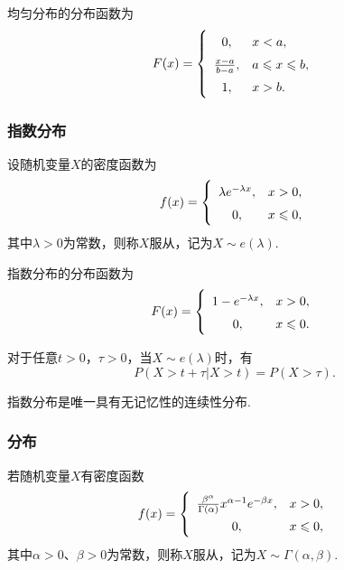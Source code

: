\begin{theorem}
均匀分布的分布函数为\begin{equation}
F(x) = \left\{ \def\arraystretch{1.5}
\begin{array}{cl}
0, & x < a, \\
\frac{x-a}{b-a}, & a \leqslant x \leqslant b, \\
1, & x > b. \\
\end{array} \right.
\end{equation}
\end{theorem}

\subsubsection{指数分布}
\begin{definition}
设随机变量\(X\)的密度函数为\begin{equation}
f(x) = \left\{ \def\arraystretch{1.5}
\begin{array}{cl}
\lambda e^{-\lambda x}, & x > 0, \\
0, & x \leqslant 0, \\
\end{array} \right.
\end{equation}其中\(\lambda > 0\)为常数，则称\(X\)服从，记为\(X \sim e(\lambda)\).
\end{definition}

\begin{theorem}
指数分布的分布函数为\begin{equation}
F(x) = \left\{ \def\arraystretch{1.5}
\begin{array}{cl}
1 - e^{-\lambda x}, & x > 0, \\
0, & x \leqslant 0. \\
\end{array} \right.
\end{equation}
\end{theorem}

\begin{theorem}[指数分布的无记忆性]
对于任意\(t > 0\)，\(\tau > 0\)，当\(X \sim e(\lambda)\)时，有\[
P(X > t + \tau \vert X > t) = P(X > \tau).
\]

指数分布是唯一具有无记忆性的连续性分布.
\end{theorem}

\subsubsection{\textGamma 分布}
\begin{definition}
若随机变量\(X\)有密度函数\begin{equation}
f(x) = \left\{
\def\arraystretch{1.5}
\begin{array}{cl}
\frac{\beta^{\alpha}}{\Gamma(\alpha)} x^{\alpha-1} e^{-\beta x}, & x > 0, \\
0, & x \leqslant 0, \\
\end{array} \right.
\end{equation}其中\(\alpha > 0\)、\(\beta > 0\)为常数，则称\(X\)服从，记为\(X \sim \Gamma(\alpha,\beta)\).
\end{definition}

